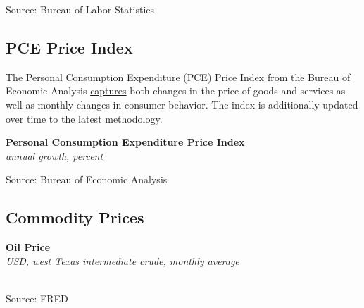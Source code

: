 \documentclass{report}
\makeatletter
\newcommand{\tbllink}[1]{\href{https://raw.githubusercontent.com/bdecon/US-chartbook/master/chartbook/data/#1}{\faTable}}
\newcommand*\short[1]{\expandafter\@gobbletwo\number\numexpr#1\relax}
\newcommand{\dateaxisticks}{
		date coordinates in=x, axis line style={draw=none},
		xmax={2021-05-15},
		max space between ticks=40,	    
		xtick={{1990-01-01}, {1992-01-01}, {1994-01-01}, 
			{1996-01-01}, {1998-01-01}, {2000-01-01}, 
			{2002-01-01}, {2004-01-01}, {2006-01-01},
			{2008-01-01}, {2010-01-01}, {2012-01-01}, {2014-01-01},
		    {2016-01-01}, {2018-01-01}, {2020-01-01}},
		minor xtick={{1989-01-01}, {1991-01-01}, {1993-01-01},
			{1995-01-01}, {1997-01-01}, {1999-01-01}, 
			{2001-01-01}, {2003-01-01}, {2005-01-01}, {2007-01-01},
		    {2009-01-01}, {2011-01-01}, {2013-01-01}, {2015-01-01},
		    {2017-01-01}, {2019-01-01}, {2021-01-01}},
		enlarge y limits={0.06}, enlarge x limits={0.01},
		}
\newcommand{\bbar}[2]{extra #1 ticks = {{#2}}, extra #1 tick labels = ,
		extra #1 tick style = {grid=major, grid style={thick, black!25}},}
\newcommand{\stdline}[4]{\addplot[very thick, no markers, color=#1] 
		table [x=#2, y=#3, col sep=comma] {#4};	}
\newcommand{\rbars}{
		\fill[color=black!10] (axis cs:{1990-07-01},\pgfkeysvalueof{/pgfplots/ymin}) rectangle 
			(axis cs:{1991-03-01}, \pgfkeysvalueof{/pgfplots/ymax});
		\fill[color=black!10] (axis cs:{2007-12-01},\pgfkeysvalueof{/pgfplots/ymin}) rectangle 
			(axis cs:{2009-07-01}, \pgfkeysvalueof{/pgfplots/ymax});
		\fill[color=black!10] (axis cs:{2001-03-01},\pgfkeysvalueof{/pgfplots/ymin}) rectangle 
			(axis cs:{2001-11-01}, \pgfkeysvalueof{/pgfplots/ymax});
		\fill[color=black!10] (axis cs:{2020-02-01},\pgfkeysvalueof{/pgfplots/ymin}) rectangle 
			(axis cs:{2021-05-15}, \pgfkeysvalueof{/pgfplots/ymax});}
\makeatother
\begin{document}
{{\begin{minipage}{0.76\textwidth}
\footnotesize{Source: Bureau of Labor Statistics} \hfill \tbllink{mxpi.csv}
\vspace{8mm}

\subsection*{\color{black!70} \seriffont PCE Price Index}
\small The Personal Consumption Expenditure (PCE) Price Index from the Bureau of Economic Analysis \href{https://www.bea.gov/data/personal-consumption-expenditures-price-index}{captures} both changes in the price of goods and services as well as monthly changes in consumer behavior. The index is additionally updated over time to the latest methodology. 


\vspace{1mm}

\normalsize \textbf{Personal Consumption Expenditure Price Index}\\
\footnotesize{\textit{annual growth, percent}}\\
\vspace{26mm}

\hspace{3mm} 

\footnotesize{Source: Bureau of Economic Analysis} \hfill \tbllink{pce_pi.csv}
\end{minipage}
\newpage
\subsection*{\color{black!70} \seriffont Commodity Prices}
\begin{minipage}{0.76\textwidth}
\small 
\vspace{1mm}

\normalsize \textbf{Oil Price}\\
\footnotesize{\textit{USD, west Texas intermediate crude, monthly average}}\\
\hspace*{-2mm} \\
\footnotesize{Source: FRED} \hfill \tbllink{wti.csv}
\end{minipage}
\vspace{12mm}

}}
\end{document}
